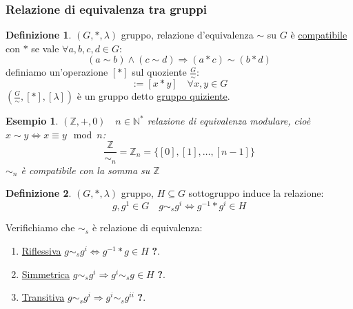\documentclass{article}
\newtheorem{exmp}{Esempio}[section]
\theoremstyle{definition}
\newtheorem{definition}{Definizione}[section]
\begin{document}
\subsubsection{Relazione di equivalenza tra gruppi}
\begin{definition}
       $ (G, *, \lambda) $ gruppo, relazione d'equivalenza $ \sim $ su $ G $ è \underline{compatibile} con $*$ se vale $ \forall a,b,c,d \in G $:
       \begin{equation*}
               (a \sim b) \wedge (c \sim d) \Rightarrow (a * c) \sim (b * d)
       \end{equation*}
       definiamo un'operazione $ [*] $ sul quoziente $ \frac{G}{\sim} $:
       \begin{equation*}
               [x][*][y] := [x*y] \quad \forall x,y \in G
       \end{equation*}
       $ (\frac{G}{\sim}, [*], [\lambda]) $ è un gruppo detto \underline{gruppo quiziente}.
\end{definition}
\begin{exmp}
        $ (\mathbb{Z}, +, 0) \quad  n \in \mathbb{N}^*$ relazione di equivalenza modulare, cioè $ x \sim y \Leftrightarrow x \equiv y \mod n $:
        \begin{equation*}
                \frac{\mathbb{Z}}{\sim_n} = \mathbb{Z}_n = \{[0], [1], \ldots, [n-1]\}
        \end{equation*}
        $\sim_n$ è compatibile con la somma su $\mathbb{Z}$
\end{exmp}

\begin{definition}
        $ (G, *, \lambda) $ gruppo, $ H \subseteq G $ sottogruppo induce la relazione:
        \begin{equation*}
                g, g^1 \in G \quad g \sim_s g^i \Leftrightarrow g^{-1} * g^i \in H
        \end{equation*}
        
        Verifichiamo che $\sim_s$ è relazione di equivalenza:
        \begin{enumerate}
                \item \underline{Riflessiva} $ g \sim_s g^i \Leftrightarrow g^{-1} * g \in H $ \textbf{?}.
                \item \underline{Simmetrica} $ g \sim_s g^i \Rightarrow g^i \sim_s g \in H $ \textbf{?}.
                \item \underline{Transitiva} $ g \sim_s g^i \Rightarrow g^i \sim_s g^{ii}$ \textbf{?}.
        \end{enumerate}
\end{definition}
\end{document}
